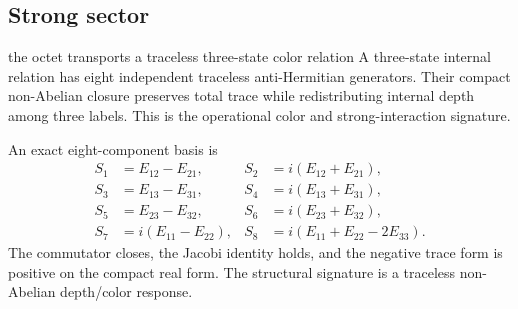 \documentclass[11pt]{article}
\numberwithin{equation}{section}
\theoremstyle{remark}
\begin{document}
\subsection{Strong sector}
\begin{interpretivebridge}{the octet transports a traceless three-state color relation}
A three-state internal relation has eight independent traceless anti-Hermitian generators. Their compact non-Abelian closure preserves total trace while redistributing internal depth among three labels. This is the operational color and strong-interaction signature.
\end{interpretivebridge}

An exact eight-component basis is
\begin{align}
S_1&=E_{12}-E_{21},&S_2&=i(E_{12}+E_{21}),\\
S_3&=E_{13}-E_{31},&S_4&=i(E_{13}+E_{31}),\\
S_5&=E_{23}-E_{32},&S_6&=i(E_{23}+E_{32}),\\
S_7&=i(E_{11}-E_{22}),&S_8&=i(E_{11}+E_{22}-2E_{33}).
\end{align}
The commutator closes, the Jacobi identity holds, and the negative trace form is positive on the compact real form. The structural signature is a traceless non-Abelian depth/color response.
\end{document}
